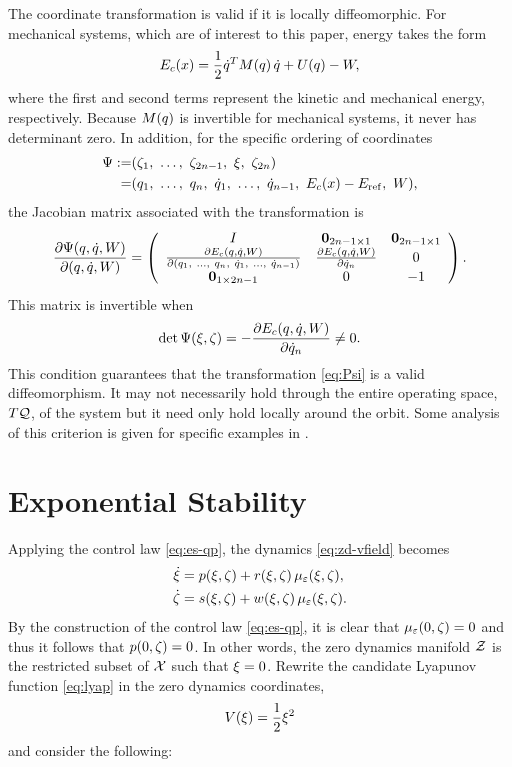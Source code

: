 % 
The coordinate transformation is valid if it is locally diffeomorphic.
% 
For mechanical systems, which are of interest to this paper, energy takes the
form
% 
\begin{align}
  \label{eq:mech-sys-nrg}
  E_{c}(x) = \frac{1}{2} \dot{q}^{T} M(q) \, \dot{q} + U(q) - W,
\end{align}
% 
where the first and second terms represent the kinetic and mechanical energy,
respectively.
% 
Because $M(q)$ is invertible for mechanical systems, it never has determinant
zero.
% 
In addition, for the specific ordering of coordinates
\begin{align*}
  \Psi :=& (\zdz_{1}, \ \ldots, \ \zdz_{2n-1}, \ \zdx, \ \zdz_{2n})\\
  =& (\q_{1}, \ \ldots, \ \q_{n}, \ \dq_{1}, \ \ldots, \ \dq_{n-1}, \ \Ec\arx -
  \Eref, \ \W),
\end{align*}
the Jacobian matrix
associated with the transformation is
\begin{align}
  \label{eq:Psi}
  \frac{\partial{\Psi(q, \dot{q}, W)}}{\partial{(q, \dot{q}, W)}} =
  \left(\begin{array}{c c c}
      I & {\mathbf 0}_{2n-1 \times 1} & {\mathbf 0}_{2n-1 \times 1}\\
      \frac{\partial{E_{c}(q, \dot{q}, W)}}{\partial{(q_{1}, \ \ldots, \ q_{n}, \ \dot{q}_{1}, \ \ldots, \ \dot{q}_{n-1})}} & \frac{\partial{E_{c}(q, \dot{q}, W)}}{\partial{\dot{q}_{n}}} & 0\\
      {\mathbf 0}_{1 \times 2n-1} & 0 & -1
    \end{array}\right).
\end{align}
% 
This matrix is invertible when
\begin{align*}
  \det \Psi(\xi, \zeta) = -\frac{\partial{E_{c}(q, \dot{q}, W)}}{\partial{\dot{q}_{n}}} \neq 0.
\end{align*}
% 
This condition guarantees that the transformation \eqref{eq:Psi} is a valid
diffeomorphism.
% 
It may not necessarily hold through the entire operating space, $T\mathcal{Q}$, of the
system but it need only hold locally around the orbit.
% 
Some analysis of this criterion is given for specific examples in
.

\section{Exponential Stability}

Applying the control law \eqref{eq:es-qp}, the dynamics \eqref{eq:zd-vfield}
becomes
\begin{align}
  \nonumber
  \dot {\xi} &= p(\xi, \zeta) + r(\xi, \zeta) \, \mu_{\varepsilon}(\xi, \zeta),\\
  \dot {\zeta} &= s(\xi, \zeta) + w(\xi, \zeta) \, \mu_{\varepsilon}(\xi, \zeta).
  \label{eq:zd-vfield-cl}
\end{align}
% 
By the construction of the control law \eqref{eq:es-qp}, it is clear that
$\mu_{\varepsilon}(0, \zeta) = 0$ and thus it follows that $p(0, \zeta) = 0$.
% 
In other words, the zero dynamics manifold $\mathcal{Z}$ is the restricted
subset of $\mathcal{X}$ such that $\xi = 0$.
% 
Rewrite the candidate Lyapunov function \eqref{eq:lyap} in the zero dynamics
coordinates,
% 
\begin{align*}
  V(\xi) = \frac{1}{2} \xi^{2}
\end{align*}
and consider the following:\vgap

